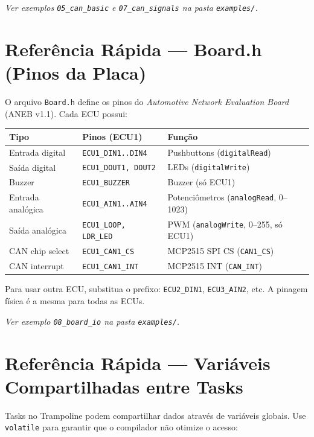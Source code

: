 \documentclass[12pt,a4paper]{article}
\begin{document}
\textit{Ver exemplos \texttt{05\_can\_basic} e \texttt{07\_can\_signals} na pasta \texttt{examples/}.}

\section{Referência Rápida --- Board.h (Pinos da Placa)}

O arquivo \texttt{Board.h} define os pinos do \emph{Automotive Network Evaluation Board} (ANEB v1.1). Cada ECU possui:

\begin{center}
\small
\begin{tabularx}{\textwidth}{llX}
  \toprule
  \textbf{Tipo} & \textbf{Pinos (ECU1)} & \textbf{Função} \\
  \midrule
  Entrada digital & \texttt{ECU1\_DIN1..DIN4} & Pushbuttons (\texttt{digitalRead}) \\
  Saída digital   & \texttt{ECU1\_DOUT1, DOUT2} & LEDs (\texttt{digitalWrite}) \\
  Buzzer          & \texttt{ECU1\_BUZZER} & Buzzer (só ECU1) \\
  Entrada analógica & \texttt{ECU1\_AIN1..AIN4} & Potenciômetros (\texttt{analogRead}, 0--1023) \\
  Saída analógica & \texttt{ECU1\_LOOP, LDR\_LED} & PWM (\texttt{analogWrite}, 0--255, só ECU1) \\
  CAN chip select & \texttt{ECU1\_CAN1\_CS} & MCP2515 SPI CS (\texttt{CAN1\_CS}) \\
  CAN interrupt   & \texttt{ECU1\_CAN1\_INT} & MCP2515 INT (\texttt{CAN\_INT}) \\
  \bottomrule
\end{tabularx}
\end{center}

Para usar outra ECU, substitua o prefixo: \texttt{ECU2\_DIN1}, \texttt{ECU3\_AIN2}, etc. A pinagem física é a mesma para todas as ECUs.

\textit{Ver exemplo \texttt{08\_board\_io} na pasta \texttt{examples/}.}

\section{Referência Rápida --- Variáveis Compartilhadas entre Tasks}

Tasks no Trampoline podem compartilhar dados através de variáveis globais. Use \texttt{volatile} para garantir que o compilador não otimize o acesso:
\end{document}
